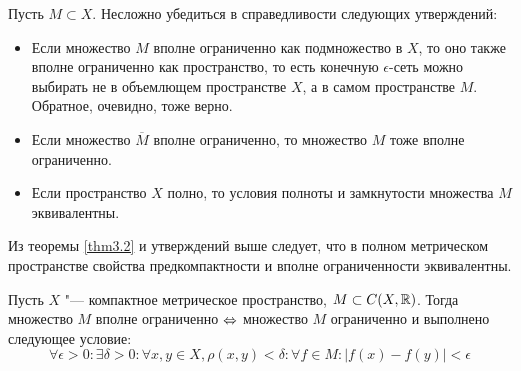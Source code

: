 \begin{note}
    Пусть $M \subset X$. Несложно убедиться в справедливости следующих утверждений:
    \begin{itemize}
        \item Если множество $M$ вполне ограниченно как подмножество в $X$, то оно также вполне ограниченно как пространство, то есть конечную $\epsilon$-сеть можно выбирать не в объемлющем пространстве $X$, а в самом пространстве $M$. Обратное, очевидно, тоже верно.
        
        \item Если множество $\overline M$ вполне ограниченно, то множество $M$ тоже вполне ограниченно.
        
        \item Если пространство $X$ полно, то условия полноты и замкнутости множества $M$ эквивалентны.
    \end{itemize}

    Из теоремы \ref{thm3.2} и утверждений выше следует, что в полном метрическом пространстве свойства предкомпактности и вполне ограниченности эквивалентны.
\end{note}

\begin{theorem}
    Пусть $X$ "--- компактное метрическое пространство, $M \subset C(X, \mathbb{R})$. Тогда множество $M$ вполне ограниченно $\Leftrightarrow$ множество $M$ ограниченно и выполнено следующее условие:
    \[
        \forall \epsilon > 0: \exists \delta > 0: \forall x, y \in X, \rho(x, y) < \delta: \forall f \in M: |f(x) - f(y)| < \epsilon 
    \]
\end{theorem}